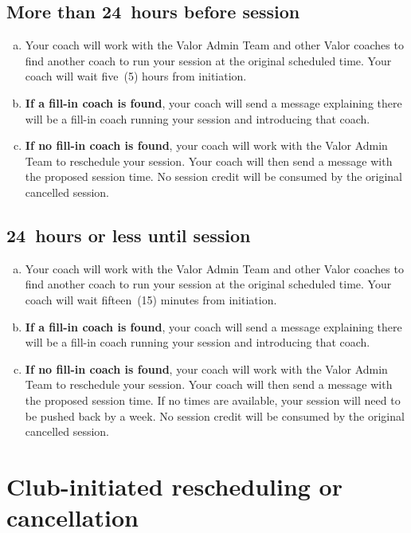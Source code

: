 \documentclass[10pt]{article}
\begin{document}
\subsection{More than 24~hours before session}
\begin{enumerate}[(a)]
\item
Your coach will work with the Valor Admin Team and other Valor coaches to find another coach to run your session at the original scheduled time. Your coach will wait five~(5) hours from initiation.

\item
\textbf{If a fill-in coach is found}, your coach will send a message explaining there will be a fill-in coach running your session and introducing that coach.

\item
\textbf{If no fill-in coach is found}, your coach will work with the Valor Admin Team to reschedule your session. Your coach will then send a message with the proposed session time. No session credit will be consumed by the original cancelled session.
\end{enumerate}

\subsection{24~hours or less until session}
\begin{enumerate}[(a)]
\item
Your coach will work with the Valor Admin Team and other Valor coaches to find another coach to run your session at the original scheduled time. Your coach will wait fifteen~(15) minutes from initiation.

\item
\textbf{If a fill-in coach is found}, your coach will send a message explaining there will be a fill-in coach running your session and introducing that coach.

\item
\textbf{If no fill-in coach is found}, your coach will work with the Valor Admin Team to reschedule your session. Your coach will then send a message with the proposed session time. If no times are available, your session will need to be pushed back by a week. No session credit will be consumed by the original cancelled session.
\end{enumerate}


\section{Club-initiated rescheduling or cancellation}
\end{document}
